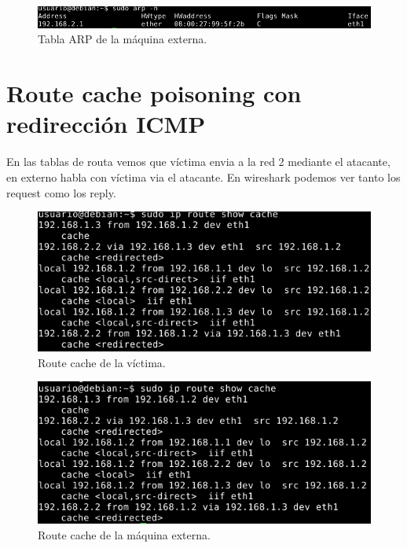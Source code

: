 \documentclass[11pt]{article}
\begin{document}
      \begin{figure}[H]
        \centering
        \includegraphics[width = \textwidth]{at_ex3}
        \caption{Tabla ARP de la máquina externa.}
      \end{figure}

  \section{Route cache poisoning con redirección ICMP}
    \par
    En las tablas de routa vemos que víctima envia a la red 2 mediante el
    atacante, en externo habla con víctima via el atacante. En wireshark podemos
    ver tanto los request como los reply.

    \begin{figure}[H]
      \centering
      \includegraphics[width = \textwidth]{route_v}
      \caption{Route cache de la víctima.}
    \end{figure}

    \begin{figure}[H]
      \centering
      \includegraphics[width = \textwidth]{route_ex}
      \caption{Route cache de la máquina externa.}
    \end{figure}
\end{document}
